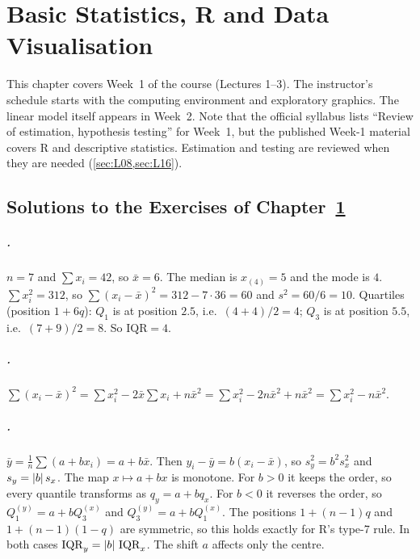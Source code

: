 \chapter{Basic Statistics, R and Data Visualisation}\label{ch:week01}

This chapter covers Week~1 of the course (Lectures 1--3). The instructor's schedule starts
with the computing environment and exploratory graphics. The linear model itself appears in
Week~2. Note that the official syllabus lists ``Review of estimation, hypothesis testing''
for Week~1, but the published Week-1 material covers R and descriptive statistics. Estimation and
testing are reviewed when they are needed (\cref{sec:L08,sec:L16}).





\section*{Solutions to the Exercises of Chapter~\ref{ch:week01}}

\paragraph{.}
$n=7$ and $\sum x_i=42$, so $\bar x=6$. The median is $x_{(4)}=5$ and the mode is $4$.
$\sum x_i^2=312$, so $\sum(x_i-\bar x)^2=312-7\cdot 36=60$ and $s^2=60/6=10$.
Quartiles (position $1+6q$): $Q_1$ is at position $2.5$, i.e.\ $(4+4)/2=4$; $Q_3$ is at position
$5.5$, i.e.\ $(7+9)/2=8$. So $\mathrm{IQR}=4$.

\paragraph{.}
$\sum(x_i-\bar x)^2=\sum x_i^2-2\bar x\sum x_i+n\bar x^2=\sum x_i^2-2n\bar x^2+n\bar x^2=\sum x_i^2-n\bar x^2$.

\paragraph{.}
$\bar y=\frac1n\sum(a+bx_i)=a+b\bar x$. Then $y_i-\bar y=b(x_i-\bar x)$, so $s_y^2=b^2s_x^2$ and
$s_y=\left|b\right|s_x$. The map $x\mapsto a+bx$ is monotone. For $b>0$ it keeps the order, so every
quantile transforms as $q_y=a+bq_x$. For $b<0$ it reverses the order, so $Q_1^{(y)}=a+bQ_3^{(x)}$ and
$Q_3^{(y)}=a+bQ_1^{(x)}$. The positions $1+(n-1)q$ and $1+(n-1)(1-q)$ are symmetric, so this holds
exactly for R's type-7 rule. In both cases $\mathrm{IQR}_y=\left|b\right|\,\mathrm{IQR}_x$.
The shift $a$ affects only the centre.

